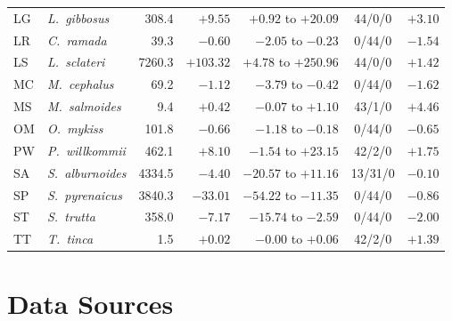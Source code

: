 \documentclass[11pt,a4paper]{article}
\begin{document}
\begin{table}[H]
\begin{tabular}{@{}l l r r r c r@{}}
LG & \textit{L.~gibbosus} & 308.4 & $+9.55$ & $+0.92$ to $+20.09$ & 44/0/0 & $+3.10$ \\
LR & \textit{C.~ramada} & 39.3 & $-0.60$ & $-2.05$ to $-0.23$ & 0/44/0 & $-1.54$ \\
LS & \textit{L.~sclateri} & 7260.3 & $+103.32$ & $+4.78$ to $+250.96$ & 44/0/0 & $+1.42$ \\
MC & \textit{M.~cephalus} & 69.2 & $-1.12$ & $-3.79$ to $-0.42$ & 0/44/0 & $-1.62$ \\
MS & \textit{M.~salmoides} & 9.4 & $+0.42$ & $-0.07$ to $+1.10$ & 43/1/0 & $+4.46$ \\
OM & \textit{O.~mykiss} & 101.8 & $-0.66$ & $-1.18$ to $-0.18$ & 0/44/0 & $-0.65$ \\
PW & \textit{P.~willkommii} & 462.1 & $+8.10$ & $-1.54$ to $+23.15$ & 42/2/0 & $+1.75$ \\
SA & \textit{S.~alburnoides} & 4334.5 & $-4.40$ & $-20.57$ to $+11.16$ & 13/31/0 & $-0.10$ \\
SP & \textit{S.~pyrenaicus} & 3840.3 & $-33.01$ & $-54.22$ to $-11.35$ & 0/44/0 & $-0.86$ \\
ST & \textit{S.~trutta} & 358.0 & $-7.17$ & $-15.74$ to $-2.59$ & 0/44/0 & $-2.00$ \\
TT & \textit{T.~tinca} & 1.5 & $+0.02$ & $-0.00$ to $+0.06$ & 42/2/0 & $+1.39$ \\
\bottomrule
\end{tabular}
\end{table}

\section{Data Sources}
\end{document}
